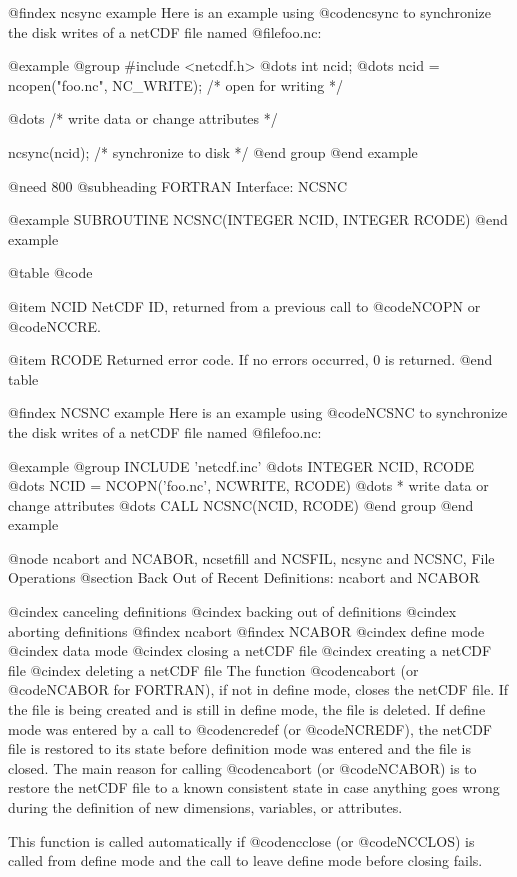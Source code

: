 @findex ncsync example
Here is an example using @code{ncsync} to synchronize the disk writes of
a netCDF file named @file{foo.nc}:

@example
@group
#include <netcdf.h>
   @dots{}
int ncid;
   @dots{}
ncid = ncopen("foo.nc", NC_WRITE);  /* open for writing */

   @dots{}          /* write data or change attributes */

ncsync(ncid);      /* synchronize to disk */
@end group
@end example

@need 800
@subheading FORTRAN Interface:  NCSNC

@example
      SUBROUTINE NCSNC(INTEGER NCID, INTEGER RCODE)
@end example

@table @code

@item NCID
NetCDF ID, returned from a previous call to @code{NCOPN} or @code{NCCRE}.

@item RCODE
Returned error code.  If no errors occurred, 0 is returned.
@end table

@findex NCSNC example
Here is an example using @code{NCSNC} to synchronize the disk writes of
a netCDF file named @file{foo.nc}:

@example
@group
      INCLUDE 'netcdf.inc'
         @dots{}
      INTEGER NCID, RCODE
         @dots{}
      NCID = NCOPN('foo.nc', NCWRITE, RCODE)
         @dots{}
* write data or change attributes
         @dots{}
      CALL NCSNC(NCID, RCODE)
@end group
@end example

@node ncabort and NCABOR, ncsetfill and NCSFIL, ncsync and NCSNC, File Operations
@section Back Out of Recent Definitions:  ncabort and NCABOR

@cindex canceling definitions
@cindex backing out of definitions
@cindex aborting definitions
@findex ncabort
@findex NCABOR
@cindex define mode
@cindex data mode
@cindex closing a netCDF file
@cindex creating a netCDF file
@cindex deleting a netCDF file
The function @code{ncabort} (or @code{NCABOR} for FORTRAN), if not in
define mode, closes the netCDF file.  If the file is being created and
is still in define mode, the file is deleted.  If define mode was
entered by a call to @code{ncredef} (or @code{NCREDF}), the netCDF file
is restored to its state before definition mode was entered and the file
is closed.  The main reason for calling @code{ncabort} (or
@code{NCABOR}) is to restore the netCDF file to a known consistent state in
case anything goes wrong during the definition of new dimensions,
variables, or attributes.

This function is called automatically if @code{ncclose} (or
@code{NCCLOS}) is called from define mode and the call to leave define
mode before closing fails.

